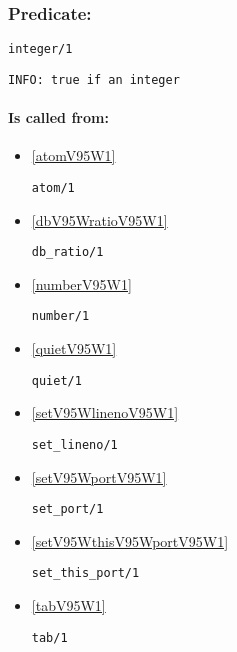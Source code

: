 \subsubsection{Predicate:} \label{integerV95W1}

\begin{verbatim}
integer/1
\end{verbatim}

{\small \begin{verbatim}
INFO: true if an integer

\end{verbatim}}
\paragraph{Is called from:} 
\begin{itemize}
\item \ref{atomV95W1} 
\begin{verbatim}
atom/1
\end{verbatim}

\item \ref{dbV95WratioV95W1} 
\begin{verbatim}
db_ratio/1
\end{verbatim}

\item \ref{numberV95W1} 
\begin{verbatim}
number/1
\end{verbatim}

\item \ref{quietV95W1} 
\begin{verbatim}
quiet/1
\end{verbatim}

\item \ref{setV95WlinenoV95W1} 
\begin{verbatim}
set_lineno/1
\end{verbatim}

\item \ref{setV95WportV95W1} 
\begin{verbatim}
set_port/1
\end{verbatim}

\item \ref{setV95WthisV95WportV95W1} 
\begin{verbatim}
set_this_port/1
\end{verbatim}

\item \ref{tabV95W1} 
\begin{verbatim}
tab/1
\end{verbatim}

\end{itemize}

